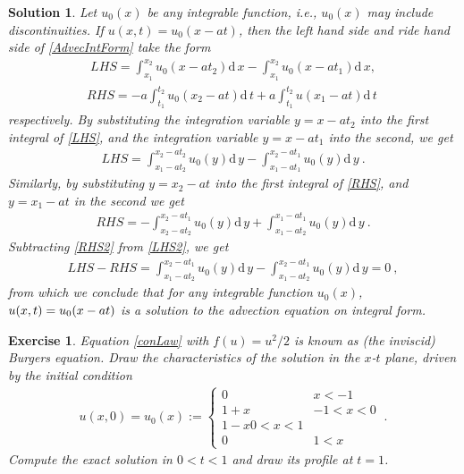\documentclass[10pt,letterpaper]{article}
\newcommand{\dif}[1][]{\mathrm{d} {#1}\,}
\newcommand{\frb}[1]{ \left(  {#1} \right) }
\theoremstyle{break}
\newtheorem{exercise}{Exercise}
\newtheorem{solution}{Solution}
\begin{document}
\begin{solution}
	Let $u_{0}(x)$ be any integrable function, i.e., $u_{0}(x)$ may include discontinuities. If $u(x,t)=u_0(x-at)$, then the left hand side and ride hand side of \eqref{AdvecIntForm} take the form
	\begin{gather} \label{LHS}
		LHS=\int_{x_{1}}^{x_{2}}u_{0}\frb{x-at_{2}}\dif x
				-\int_{x_{1}}^{x_{2}}u_{0}\frb{x-at_{1}} \dif x,
	\end{gather}
	\begin{gather} \label{RHS}
		RHS=-a\int_{t_{1}}^{t_{2}}u_{0}\frb{x_{2}-at}\dif t
				+a\int_{t_{1}}^{t_{2}}u\frb{x_{1}-at}\dif t\ 
	\end{gather}
	respectively. By substituting the integration variable $y=x-at_{2}$ into the first integral of \eqref{LHS}, and the integration variable $y=x-at_{1}$ into the second, we get
	\begin{gather} \label{LHS2}
		LHS=\int_{x_{1}-at_{2}}^{x_{2}-at_{2}}u_{0}\frb{y}\dif y
			-\int_{x_{1}-at_{1}}^{x_{2}-at_{1}}u_{0}\frb{y}\dif y\ .
	\end{gather}
	Similarly, by substituting $y=x_{2}-at$ into the first integral of \eqref{RHS}, and $y=x_{1}-at$ in the second we get 
	\begin{gather} \label{RHS2}
		RHS=- \int_{x_{2}-at_{2}}^{x_{2}-at_{1}}u_{0}\frb{y}\dif y
			+\int_{x_{1}-at_{2}}^{x_{1}-at_{1}}u_{0}\frb{y} \dif y\ .
	\end{gather}
	Subtracting \eqref{RHS2} from \eqref{LHS2}, we get
	\begin{gather}
		LHS-RHS=\int_{x_{1}-at_{2}}^{x_{2}-at_{1}}u_{0}\frb{y} \dif y
			-\int_{x_{1}-at_{2}}^{x_{2}-at_{1}}u_{0}\frb{y} \dif y=0\ ,
	\end{gather}
	from which we conclude that for any integrable function $u_{0}\!\left(x\right)$, $u\!\left(x,t\right)=u_{0}\text{\!}\left(x-at\right)$ is a solution to the advection equation on integral form.
\end{solution}
	

\begin{exercise}
	Equation \eqref{conLaw} with $f(u)=u^2/2$ is known as (the inviscid) Burgers equation. Draw the characteristics of the solution in the $x$-$t$ plane, driven by the initial condition
	\begin{gather} \label{inCond1}
		u(x,0)=
		u_0(x):=\begin{cases}
				0 	&   x< -1
				\\
				1+x & -1 < x<0
				\\
				1-x    0 < x<1
				\\
				0 	&  1 < x
			\end{cases}\ .
	\end{gather}
	Compute the exact solution in $0<t<1$ and draw its profile at $t=1$.
\end{exercise}
\end{document}
